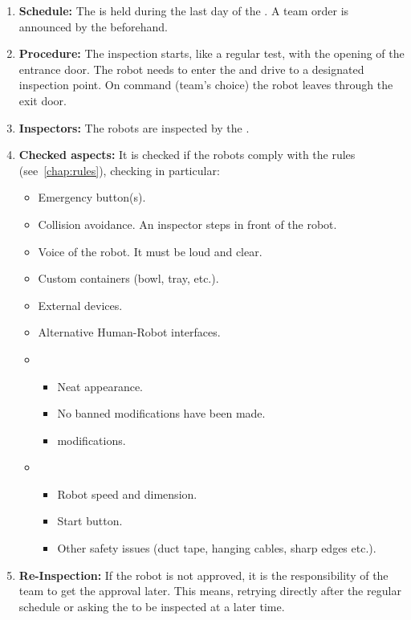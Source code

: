 \begin{enumerate}
	\item \textbf{Schedule:} The \RobotInspection{} is held during the last day of the \SetupDays{}. A team order is announced by the \OC{} beforehand.
	\item \textbf{Procedure:} The inspection starts, like a regular test, with the opening of the entrance door. The robot needs to enter the \Arena{} and drive to a designated inspection point. On command (team's choice) the robot leaves through the exit door.
	\item \textbf{Inspectors:} The robots are inspected by the \TC{}.
	\item \textbf{Checked aspects:} It is checked if the robots comply with the rules (see~\ref{chap:rules}), checking in particular:
	\begin{itemize}
		\item Emergency button(s).
		\item Collision avoidance. An inspector steps in front of the robot.
		\item Voice of the robot. It must be loud and clear.
		\item Custom containers (bowl, tray, etc.).
		\item External devices.
		\item Alternative Human-Robot interfaces.
		\item {}
		\begin{itemize}
			\item Neat appearance.
			\item No banned modifications have been made.
			\item {} modifications.
		\end{itemize}
		\item {}
		\begin{itemize}
			\item Robot speed and dimension.
			\item Start button.
			\item Other safety issues (duct tape, hanging cables, sharp edges etc.).
		\end{itemize}
	\end{itemize}
	\item \textbf{Re-Inspection:} If the robot is not approved, it is the responsibility of the team to get the approval later. This means, retrying directly after the regular \RobotInspection{} schedule or asking the  to be inspected at a later time.

\end{enumerate}
